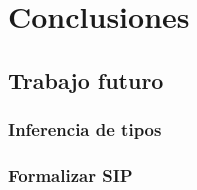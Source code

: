 \documentclass[]{report}
\begin{document}
	\chapter{Conclusiones}
	
	\section{Trabajo futuro}
	\subsection{Inferencia de tipos}
	\subsection{Formalizar SIP}
	
	
	\printbibliography
	
\end{document}
